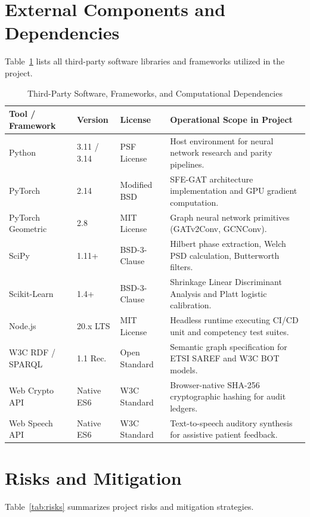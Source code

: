 \documentclass[12pt,a4paper]{report}
\begin{document}
\section{External Components and Dependencies}
Table~\ref{tab:tool_disclosure} lists all third-party software libraries and frameworks utilized in the project.

\begin{table}[H]
\centering
\small
\caption{Third-Party Software, Frameworks, and Computational Dependencies}
\label{tab:tool_disclosure}
\begin{tabularx}{\textwidth}{p{3.2cm} p{2.2cm} p{3.2cm} X}
\toprule
\textbf{Tool / Framework} & \textbf{Version} & \textbf{License} & \textbf{Operational Scope in Project} \\
\midrule
Python & 3.11 / 3.14 & PSF License & Host environment for neural network research and parity pipelines. \\
PyTorch & 2.14 & Modified BSD & SFE-GAT architecture implementation and GPU gradient computation. \\
PyTorch Geometric & 2.8 & MIT License & Graph neural network primitives (GATv2Conv, GCNConv). \\
SciPy & 1.11+ & BSD-3-Clause & Hilbert phase extraction, Welch PSD calculation, Butterworth filters. \\
Scikit-Learn & 1.4+ & BSD-3-Clause & Shrinkage Linear Discriminant Analysis and Platt logistic calibration. \\
Node.js & 20.x LTS & MIT License & Headless runtime executing CI/CD unit and competency test suites. \\
W3C RDF / SPARQL & 1.1 Rec. & Open Standard & Semantic graph specification for ETSI SAREF and W3C BOT models. \\
Web Crypto API & Native ES6 & W3C Standard & Browser-native SHA-256 cryptographic hashing for audit ledgers. \\
Web Speech API & Native ES6 & W3C Standard & Text-to-speech auditory synthesis for assistive patient feedback. \\
\bottomrule
\end{tabularx}
\end{table}

\section{Risks and Mitigation}
Table~\ref{tab:risks} summarizes project risks and mitigation strategies.
\end{document}
